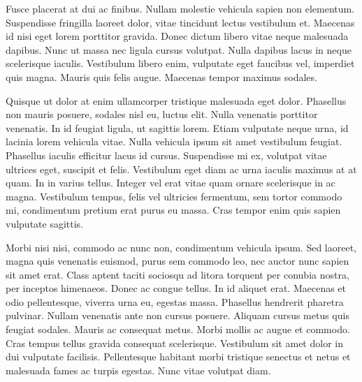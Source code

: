 \documentclass{article}
\begin{document}
	Fusce placerat at dui ac finibus. Nullam molestie vehicula sapien non elementum. Suspendisse fringilla laoreet dolor, vitae tincidunt lectus vestibulum et. Maecenas id nisi eget lorem porttitor gravida. Donec dictum libero vitae neque malesuada dapibus. Nunc ut massa nec ligula cursus volutpat. Nulla dapibus lacus in neque scelerisque iaculis. Vestibulum libero enim, vulputate eget faucibus vel, imperdiet quis magna. Mauris quis felis augue. Maecenas tempor maximus sodales.
	
	Quisque ut dolor at enim ullamcorper tristique malesuada eget dolor. Phasellus non mauris posuere, sodales nisl eu, luctus elit. Nulla venenatis porttitor venenatis. In id feugiat ligula, ut sagittis lorem. Etiam vulputate neque urna, id lacinia lorem vehicula vitae. Nulla vehicula ipsum sit amet vestibulum feugiat. Phasellus iaculis efficitur lacus id cursus. Suspendisse mi ex, volutpat vitae ultrices eget, suscipit et felis. Vestibulum eget diam ac urna iaculis maximus at at quam. In in varius tellus. Integer vel erat vitae quam ornare scelerisque in ac magna. Vestibulum tempus, felis vel ultricies fermentum, sem tortor commodo mi, condimentum pretium erat purus eu massa. Cras tempor enim quis sapien vulputate sagittis.
	
	Morbi nisi nisi, commodo ac nunc non, condimentum vehicula ipsum. Sed laoreet, magna quis venenatis euismod, purus sem commodo leo, nec auctor nunc sapien sit amet erat. Class aptent taciti sociosqu ad litora torquent per conubia nostra, per inceptos himenaeos. Donec ac congue tellus. In id aliquet erat. Maecenas et odio pellentesque, viverra urna eu, egestas massa. Phasellus hendrerit pharetra pulvinar. Nullam venenatis ante non cursus posuere. Aliquam cursus metus quis feugiat sodales. Mauris ac consequat metus. Morbi mollis ac augue et commodo. Cras tempus tellus gravida consequat scelerisque. Vestibulum sit amet dolor in dui vulputate facilisis. Pellentesque habitant morbi tristique senectus et netus et malesuada fames ac turpis egestas. Nunc vitae volutpat diam.
\end{document}
